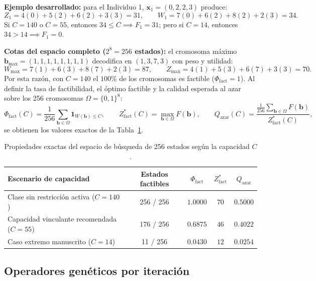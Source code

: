 \documentclass[11pt,a4paper]{article}
\begin{document}
\textbf{Ejemplo desarrollado:} para el Individuo 1, $\mathbf{x}_1 = (0,2,2,3)$ produce:
\[
Z_1 = 4(0) + 5(2) + 6(2) + 3(3) = 31, \qquad W_1 = 7(0) + 6(2) + 8(2) + 2(3) = 34.
\]
Si $C = 140$ o $C = 55$, entonces $34 \le C \implies F_1 = 31$; pero si $C = 14$, entonces $34 > 14 \implies F_1 = 0$.

\textbf{Cotas del espacio completo ($2^8 = 256$ estados):} el cromosoma m\'aximo $\mathbf{b}_{\max} = (1,1,1,1,1,1,1,1)$ decodifica en $(1, 3, 7, 3)$ con peso y utilidad:
\[
W_{\max} = 7(1)+6(3)+8(7)+2(3) = 87, \qquad Z_{\max} = 4(1)+5(3)+6(7)+3(3) = 70.
\]
Por esta raz\'on, con $C = 140$ el $100\%$ de los cromosomas es factible ($\Phi_{\text{fact}} = 1$). Al definir la tasa de factibilidad, el \'optimo factible y la calidad esperada al azar sobre los 256 cromosomas $\Omega = \{0,1\}^8$:
\begin{equation}
\Phi_{\text{fact}}(C) = \frac{1}{256}\sum_{\mathbf{b}\in\Omega}\mathbf{1}_{W(\mathbf{b})\le C}, \qquad
Z^*_{\text{fact}}(C) = \max_{\mathbf{b}\in\Omega} F(\mathbf{b}), \qquad
Q_{\text{azar}}(C) = \frac{\frac{1}{256}\sum_{\mathbf{b}\in\Omega} F(\mathbf{b})}{Z^*_{\text{fact}}(C)},
\end{equation}
se obtienen los valores exactos de la Tabla~\ref{tab:espacio}.

\begin{table}[h]
\centering
\caption{Propiedades exactas del espacio de b\'usqueda de 256 estados seg\'un la capacidad $C$.}
\label{tab:espacio}
\begin{tabular}{@{}lcccc@{}}
\toprule
\textbf{Escenario de capacidad} & \textbf{Estados factibles} & $\Phi_{\text{fact}}$ & $Z^*_{\text{fact}}$ & $Q_{\text{azar}}$ \\
\midrule
Clase sin restricci\'on activa ($C = 140$) & 256 / 256 & $1.0000$ & $70$ & $0.5000$ \\
Capacidad vinculante recomendada ($C = 55$) & 176 / 256 & $0.6875$ & $46$ & $0.4022$ \\
Caso extremo manuscrito ($C = 14$) & 11 / 256 & $0.0430$ & $12$ & $0.0254$ \\
\bottomrule
\end{tabular}
\end{table}

\subsection{Operadores gen\'eticos por iteraci\'on}
\end{document}
